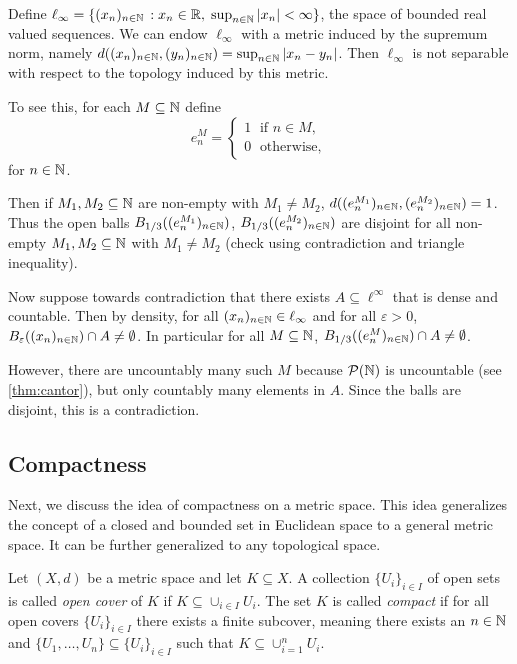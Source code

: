 \documentclass{article}
\begin{document}
\begin{example}
Define $\ell_\infty=\{ (x_n)_{n\in {\mathbb{N}}} \, : x_n \in {\mathbb{R}} , \; \sup_{n\in {\mathbb{N}}} \vert x_n \vert <\infty \}$, the space of bounded real valued sequences. We can endow $\ell_\infty$ with a metric induced by the supremum norm, namely $d((x_n)_{n\in {\mathbb{N}}}, (y_n)_{n\in {\mathbb{N}}}) = \sup_{n\in {\mathbb{N}}} \vert x_n-y_n\vert$. 
Then $\ell_\infty$ is not separable with respect to the topology induced by this metric. 

To see this, for each $M\subseteq {\mathbb{N}}$ define 
\begin{equation*}
    e^M_n = \begin{cases} 1 \; \text{ if } n \in M,\\
    0 \; \text{ otherwise},
    \end{cases}
\end{equation*}
for $n \in {\mathbb{N}}$. 

Then if $M_1, M_2\subseteq {\mathbb{N}}$ are non-empty with $M_1\neq M_2$, $d((e^{M_1}_n)_{n\in {\mathbb{N}}},(e^{M_2}_n)_{n\in {\mathbb{N}}}) = 1$. Thus the open balls $B_{1/3}((e^{M_1}_n)_{n \in {\mathbb{N}}})$, $B_{1/3}((e^{M_2}_n)_{n \in {\mathbb{N}}})$ are disjoint for all non-empty $M_1, M_2\subseteq {\mathbb{N}}$ with $M_1\neq M_2$ (check using contradiction and triangle inequality).

Now suppose towards contradiction that there exists $A \subseteq \ell^\infty$ that is dense and countable.  Then by density, for all $(x_n)_{n \in {\mathbb{N}}} \in \ell_\infty$ and for all $\varepsilon>0$, $B_\varepsilon((x_n)_{n \in {\mathbb{N}}})\cap A \neq \emptyset$. In particular for all $M \subseteq {\mathbb{N}}$, $B_{1/3}((e^{M}_n)_{n \in {\mathbb{N}}})\cap A \neq \emptyset$. 

However, there are uncountably many such $M$ because $\mathcal{P}({\mathbb{N}})$ is uncountable (see \cref{thm:cantor}), but only countably many elements in $A$. Since the balls are disjoint, this is a contradiction. 
\end{example}

\subsection{Compactness}

Next, we discuss the idea of compactness on a metric space. This idea generalizes the concept of a closed and bounded set in Euclidean space to a general metric space. It can be further generalized to any topological space. 

\begin{definition}[Compact]
Let $(X,d)$ be a metric space and let $K\subseteq X$. A collection $\{U_i\}_{i\in I} $ of open sets is called \emph{open cover} of $K$ if $K\subseteq \cup_{i\in I} U_i$. The set $K$ is called \emph{compact} if for all open covers $\{U_i\}_{i\in I}$ there exists a finite subcover, meaning there exists an $n\in {\mathbb{N}}$ and $\{U_1,\ldots,U_n\}\subseteq \{U_i\}_{i\in I}$ such that $K\subseteq \cup_{i=1}^n U_i$.
\end{definition}
\end{document}
